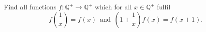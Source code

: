 Find all functions $f:\mathbb{Q}^{+}\rightarrow \mathbb{Q}^{+}$ which for all $x \in \mathbb{Q}^{+}$ fulfil\[f\left(\frac{1}{x}\right)=f(x) \ \ \text{and} \ \ \left(1+\frac{1}{x}\right)f(x)=f(x+1). \]